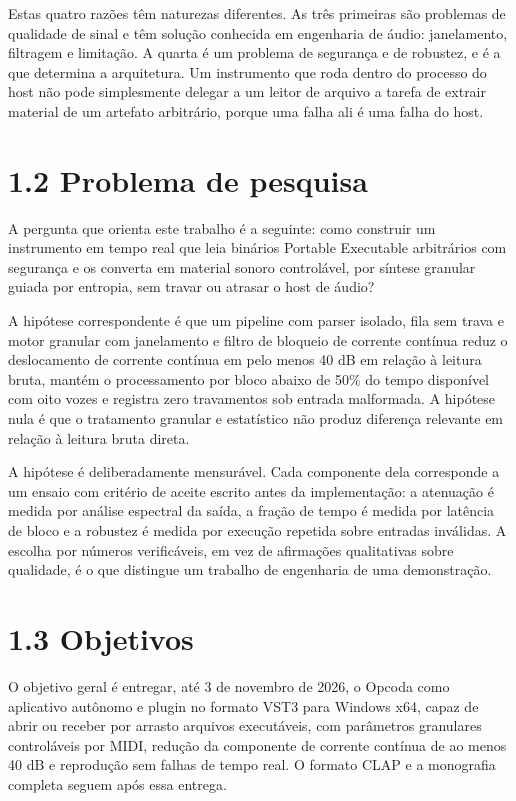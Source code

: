 \documentclass[12pt,a4paper]{article}
\begin{document}
Estas quatro razões têm naturezas diferentes. As três primeiras são problemas de qualidade de sinal e têm solução conhecida em engenharia de áudio: janelamento, filtragem e limitação. A quarta é um problema de segurança e de robustez, e é a que determina a arquitetura. Um instrumento que roda dentro do processo do host não pode simplesmente delegar a um leitor de arquivo a tarefa de extrair material de um artefato arbitrário, porque uma falha ali é uma falha do host.


\section*{1.2 Problema de pesquisa}

A pergunta que orienta este trabalho é a seguinte: como construir um instrumento em tempo real que leia binários Portable Executable arbitrários com segurança e os converta em material sonoro controlável, por síntese granular guiada por entropia, sem travar ou atrasar o host de áudio?


A hipótese correspondente é que um pipeline com parser isolado, fila sem trava e motor granular com janelamento e filtro de bloqueio de corrente contínua reduz o deslocamento de corrente contínua em pelo menos 40 dB em relação à leitura bruta, mantém o processamento por bloco abaixo de 50\% do tempo disponível com oito vozes e registra zero travamentos sob entrada malformada. A hipótese nula é que o tratamento granular e estatístico não produz diferença relevante em relação à leitura bruta direta.


A hipótese é deliberadamente mensurável. Cada componente dela corresponde a um ensaio com critério de aceite escrito antes da implementação: a atenuação é medida por análise espectral da saída, a fração de tempo é medida por latência de bloco e a robustez é medida por execução repetida sobre entradas inválidas. A escolha por números verificáveis, em vez de afirmações qualitativas sobre qualidade, é o que distingue um trabalho de engenharia de uma demonstração.


\section*{1.3 Objetivos}

O objetivo geral é entregar, até 3 de novembro de 2026, o Opcoda como aplicativo autônomo e plugin no formato VST3 para Windows x64, capaz de abrir ou receber por arrasto arquivos executáveis, com parâmetros granulares controláveis por MIDI, redução da componente de corrente contínua de ao menos 40 dB e reprodução sem falhas de tempo real. O formato CLAP e a monografia completa seguem após essa entrega.
\end{document}
